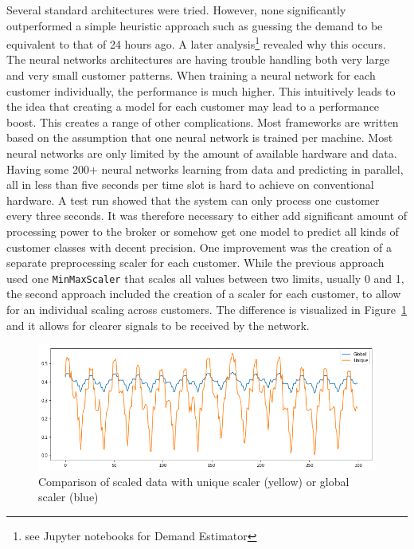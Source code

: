 Several standard architectures were tried. However, none significantly outperformed a simple heuristic approach such as
guessing the demand to be equivalent to that of 24 hours ago. A later analysis\footnote{see Jupyter notebooks for Demand
Estimator}
revealed why this occurs. The neural networks architectures are having trouble handling both very large and very small
customer patterns. When training a neural network for each customer individually, the performance is much higher. This
intuitively leads to the idea that creating a model for each customer may lead to a performance boost. This 
creates a range of other complications. Most frameworks are written based on the assumption that one neural network is
trained per machine. Most neural networks are only limited by the amount of available hardware and data. Having some
200+ neural networks learning from data and predicting in parallel, all in less than five seconds per time slot is hard
to achieve on conventional hardware. A test run showed that the system can only
process one customer every three seconds. It was therefore necessary to either add significant amount of processing
power to the broker or somehow get one model to predict all kinds of customer classes with decent precision. One
improvement was the creation of a separate preprocessing scaler for each customer. While the previous approach used one
\texttt{MinMaxScaler} that scales all values between two limits, usually 0 and 1, the second approach included the
creation of a scaler for each customer, to allow for an individual scaling across customers. The difference is visualized
in Figure~\ref{fig:imgfrosty} and it allows for clearer signals to be received by the network.


\begin{figure}[]
    \centering
    \includegraphics[width=1.0\linewidth]{img/frosty_scaled.png}
    \caption{Comparison of scaled data with unique scaler (yellow) or global scaler (blue)}
    \label{fig:imgfrosty}
\end{figure}

